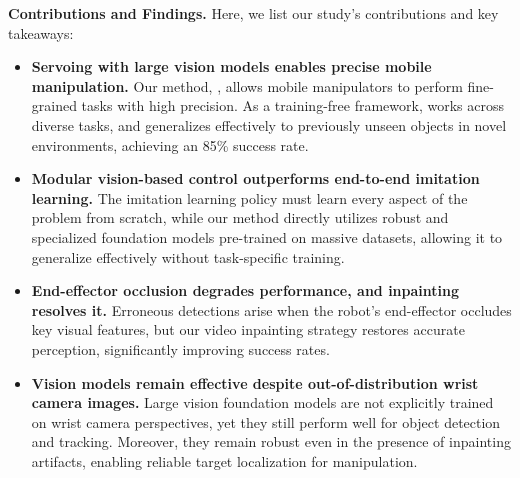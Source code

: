 \noindent \textbf{Contributions and Findings.} Here, we list our study's contributions and key takeaways:
\begin{itemize}
  \item \textbf{Servoing with large vision models enables precise mobile manipulation.} 
  Our method, \name, allows mobile manipulators to perform fine-grained tasks with high precision. As a training-free framework, \name works across diverse tasks, and generalizes effectively to previously unseen objects in novel environments, achieving an 85\% success rate.
  \item \textbf{Modular vision-based control outperforms end-to-end imitation learning.} 
  The imitation learning policy must learn every aspect of the problem from scratch, while our method directly utilizes robust and specialized foundation models pre-trained on massive datasets, allowing it to generalize effectively without task-specific training.
  \item \textbf{End-effector occlusion degrades performance, and inpainting resolves it.} Erroneous detections arise when the robot’s end-effector occludes key visual features, but our video inpainting strategy restores accurate perception, significantly improving success rates.
  \item \textbf{Vision models remain effective despite out-of-distribution wrist camera images.} Large vision foundation models are not explicitly trained on wrist camera perspectives, yet they still perform well for object detection and tracking. Moreover, they remain robust even in the presence of inpainting artifacts, enabling reliable target localization for manipulation.
\end{itemize}













